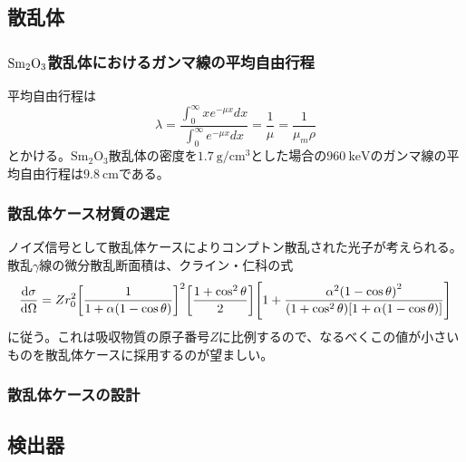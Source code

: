 \documentclass[dvipdfmx]{jreport}
\begin{document}
\subsection{散乱体}

\subsubsection{$\ce{Sm_{2}O_{3}}$散乱体におけるガンマ線の平均自由行程}
平均自由行程は
\begin{equation}
  \label{mfp}
  \lambda = \frac{\int_{0}^{\infty} xe^{-\mu x} dx}{\int_{0}^{\infty} e^{-\mu x} dx} = \frac{1}{\mu} = \frac{1}{\mu_{m} \rho}
\end{equation}
とかける。$\mathrm{Sm_{2}O_{3}}$散乱体の密度を$1.7\ \mathrm{g/cm^3}$とした場合の$960\ \mathrm{keV}$のガンマ線の平均自由行程は$9.8\ \mathrm{cm}$である。

\subsubsection{散乱体ケース材質の選定}
ノイズ信号として散乱体ケースによりコンプトン散乱された光子が考えられる。散乱$\gamma$線の微分散乱断面積は、クライン・仁科の式
\begin{equation}
  \dv{\sigma}{\Omega} = Zr_{0}^{2} \qty[\frac{1}{1 + \alpha \qty(1 - \cos \theta)}]^{2} \qty[\frac{1 + \cos^{2} \theta}{2}]
  \qty[1 + \frac{\alpha^{2} \qty(1 - \cos \theta)^{2} }{\qty(1 + \cos^2 \theta) \qty[1 + \alpha \qty(1 - \cos \theta)]}]
\end{equation}
に従う。これは吸収物質の原子番号$Z$に比例するので、なるべくこの値が小さいものを散乱体ケースに採用するのが望ましい。

\subsubsection{散乱体ケースの設計}

\subsection{検出器}
\end{document}
